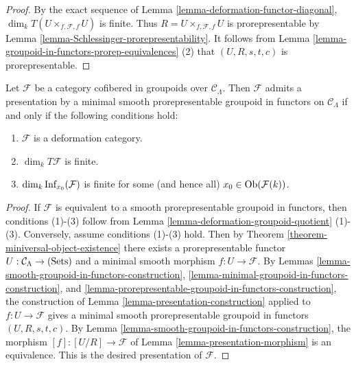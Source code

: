 \begin{proof}
By the exact sequence of Lemma \ref{lemma-deformation-functor-diagonal}, 
$\dim_{k} T(U \times_{f,\mathcal F,f} U)$ is finite.  Thus $R =U 
\times_{f,\mathcal F,f} U$ is prorepresentable by Lemma 
\ref{lemma-Schlessinger-prorepresentability}. It follows from Lemma 
\ref{lemma-groupoid-in-functors-prorep-equivalences} (2) that $(U,R,s,t,c)$ is 
prorepresentable.
\end{proof}

\begin{theorem}
\label{theorem-presentation-deformation-groupoid}
Let $\mathcal F$ be a category cofibered in groupoids over $\mathcal 
C_{\Lambda}$.  Then $\mathcal F$ admits a presentation by a minimal smooth 
prorepresentable groupoid in functors on $\mathcal C_{\Lambda}$ if and only if 
the following conditions hold:
\begin{enumerate}
\item $\mathcal F$ is a deformation category.
\item $\dim_k T\mathcal F$ is finite.
\item $\dim_k \textnormal{Inf}_{x_0}(\mathcal F)$ is finite for some (and hence 
all) $x_0 \in \textnormal{Ob}(\mathcal F(k))$.
\end{enumerate}
\end{theorem}

\begin{proof}
If $\mathcal F$ is equivalent to a smooth prorepresentable groupoid in 
functors, then conditions (1)-(3) follow from Lemma 
\ref{lemma-deformation-groupoid-quotient} (1)-(3).  Conversely, assume 
conditions (1)-(3) hold. Then by Theorem 
\ref{theorem-miniversal-object-existence} there exists a prorepresentable 
functor $U: \mathcal C_{\Lambda} \rightarrow \textnormal{(Sets)}$ and a minimal 
smooth morphism $f: U \rightarrow \mathcal F$.  By Lemmas 
\ref{lemma-smooth-groupoid-in-functors-construction}, 
\ref{lemma-minimal-groupoid-in-functors-construction}, and 
\ref{lemma-prorepresentable-groupoid-in-functors-construction}, the 
construction of Lemma \ref{lemma-presentation-construction} applied to $f: U 
\rightarrow \mathcal F$ gives a minimal smooth prorepresentable groupoid in 
functors $(U,R,s,t,c)$. By Lemma 
\ref{lemma-smooth-groupoid-in-functors-construction}, the morphism $[f]: [U/R] 
\rightarrow \mathcal F$ of Lemma \ref{lemma-presentation-morphism} is an 
equivalence.  This is the desired presentation of $\mathcal F$.
\end{proof}




